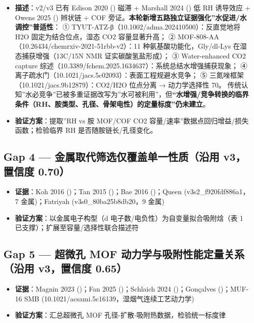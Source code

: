 \documentclass[12pt,a4paper]{ctexart}
\providecommand{\tightlist}{%
  \setlength{\itemsep}{0pt}\setlength{\parskip}{0pt}}
\begin{document}
\begin{itemize}
\tightlist
\item
  \textbf{描述}：v2/v3 已有 Edison 2020 (\cite{p20}) 磁滞 + Marshall 2024 (\cite{p35}) 低 RH 诱导效应 + Owens 2025 (\cite{p24}) 辫状链 + COF 旁证。\textbf{本轮新增五路独立证据强化''水促进/水调控''普适性}： ① TYUT-ATZ-β（10.1002/adma.202410500）：反直觉地将 H2O 固定为结合位点，湿态 CO2 容量显著升高； ② MOF-808-AA（10.26434/chemrxiv-2021-51rbb-v2）：11 种氨基酸功能化，Gly/dl-Lys 在湿态捕获增强（13C/15N NMR 证实碳酸氢盐形成）； ③ Water-enhanced CO2 capture 综述（10.3389/fchem.2025.1634637）：系统总结水增强捕获现象； ④ 离子疏水门（10.1021/jacs.5c02093）：表面工程规避水竞争； ⑤ 三氮唑框架（10.1021/jacs.9b12879）：CO2/H2O 位点分离 → 动力学选择性 70。 传统认知''水必竞争''已被多重证据改写为''水可被利用''，但\textbf{``水增强/竞争转换的临界条件（RH、胺类型、孔径、骨架电性）的定量标度''仍未建立}。
\item
  \textbf{验证方案}：提取''RH vs 胺 MOF/COF CO2 容量/速率''数据点回归增益/损失函数；检验临界 RH 是否随胺链长/孔径变化。
\end{itemize}

\subsection{Gap 4 --- 金属取代筛选仅覆盖单一性质（沿用 v3，置信度 0.70）}\label{gap:gap-4-ux91d1ux5c5eux53d6ux4ee3ux7b5bux9009ux4ec5ux8986ux76d6ux5355ux4e00ux6027ux8d28ux6cbfux7528-v3ux7f6eux4fe1ux5ea6-0.70}

\begin{itemize}
\tightlist
\item
  \textbf{证据}：Koh 2016 (\cite{p26})；Tan 2015 (\cite{p15})；Bae 2016 (\cite{p6})；Queen (v3s2\_f920fdf886a1，7 金属)；Fatriyah (v3s0\_80ba25b8db20，9 金属)
\item
  \textbf{验证方案}：以金属电子构型（d 电子数/电负性）为自变量拟合吸附焓（表 1 已支撑）；扩展至容量/选择性联合描述符
\end{itemize}

\subsection{Gap 5 --- 超微孔 MOF 动力学与吸附性能定量关系（沿用 v3，置信度 0.65）}\label{gap:gap-5-ux8d85ux5faeux5b54-mof-ux52a8ux529bux5b66ux4e0eux5438ux9644ux6027ux80fdux5b9aux91cfux5173ux7cfbux6cbfux7528-v3ux7f6eux4fe1ux5ea6-0.65}

\begin{itemize}
\tightlist
\item
  \textbf{证据}：Magnin 2023 (\cite{p17})；Fan 2025 (\cite{p13})；Schlaich 2024 (\cite{p37})；Gonçalves (\cite{p27})；MUF-16 SMB (10.1021/acsami.5c16139，湿烟气连续工艺动力学)
\item
  \textbf{验证方案}：汇总超微孔 MOF 孔径-扩散-吸附热数据，检验统一标度律
\end{itemize}
\end{document}
